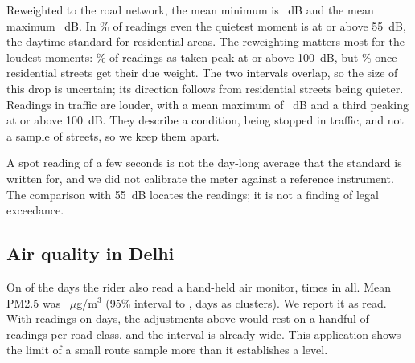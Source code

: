 \documentclass[11pt]{article}
\begin{document}
\begin{table}[H]
\centering
\caption{Street noise in Delhi from sound-meter readings, with 95\% confidence intervals. Each reading gives the minimum and maximum level during the reading. The first two columns use readings at planned stops: ``as read'' weights them equally, and ``road network'' post-stratifies them to the road classes of the drawn sample. Traffic stops are readings taken while halted in traffic and are not part of the other columns. Intervals treat fieldwork days as clusters. Every traffic-stop reading had a minimum above 55~dB, so that cell has no interval.}
\label{tab:noise}
\end{table}

Reweighted to the road network, the mean minimum is \noiseroadnetworkmin~dB and the mean maximum \noiseroadnetworkmax~dB. In \noiseroadnetworkminatleastFiveFive\% of readings even the quietest moment is at or above 55~dB, the daytime standard for residential areas. The reweighting matters most for the loudest moments: \noiseasreadmaxatleastOneZeroZero\% of readings as taken peak at or above 100~dB, but \noiseroadnetworkmaxatleastOneZeroZero\% once residential streets get their due weight. The two intervals overlap, so the size of this drop is uncertain; its direction follows from residential streets being quieter. Readings in traffic are louder, with a mean maximum of \noiseattrafficstopsasreadmax~dB and a third peaking at or above 100~dB. They describe a condition, being stopped in traffic, and not a sample of streets, so we keep them apart.

A spot reading of a few seconds is not the day-long average that the standard is written for, and we did not calibrate the meter against a reference instrument. The comparison with 55~dB locates the readings; it is not a finding of legal exceedance.

\subsection{Air quality in Delhi}

On \airdays{} of the days the rider also read a hand-held air monitor, \airreadings{} times in all. Mean PM2.5 was \airpm~$\mu$g/m$^3$ (95\% interval \airpmlow{} to \airpmhigh, days as clusters). We report it as read. With \airreadings{} readings on \airdays{} days, the adjustments above would rest on a handful of readings per road class, and the interval is already wide. This application shows the limit of a small route sample more than it establishes a level.
\end{document}
